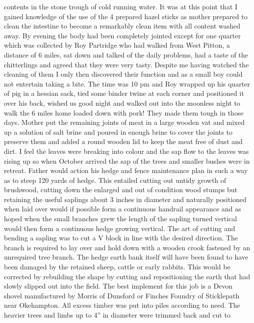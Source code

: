 contents in the stone trough of cold running water.  It was at this point that
I gained knowledge of the use of the 4 prepared hazel sticks as mother prepared
to clean the intestine to become a remarkably clean item with all content
washed away. By evening the body had been completely jointed except for one
quarter which was collected by Roy Partridge who had walked from West Pitton, a
distance of 6 miles, sat down and talked of the daily problems, had a taste of
the chitterlings and agreed that they were very tasty.  Despite me having
watched the cleaning of them I only then discovered their function and as a
small boy could not entertain taking a bite.  The time was 10 pm and Roy
wrapped up his quarter of pig in a hessian sack, tied some binder twine at each
corner and positioned it over his back, wished us good night and walked out
into the moonless night to walk the 6 miles home loaded down with pork!  They
made them tough in those days. Mother put the remaining joints of meat in a
large wooden vat and mixed up a solution of salt brine and poured in enough
brine to cover the joints to preserve them and added a round wooden lid to keep
the meat free of dust and dirt. I feel the leaves were breaking into colour and
the sap flow to the leaves was rising up so when October arrived the sap of the
trees and smaller bushes were in retreat. Father would action his hedge and
fence maintenance plan in such a way as to steep 120 yards of hedge.  This
entailed cutting out untidy growth of brushwood, cutting down the enlarged and
out of condition wood stumps but retaining the useful saplings about 3 inches
in diameter and naturally positioned when laid over would if possible form a
continuous handrail appearance  and as hoped when the small branches grew the
length of the sapling turned vertical would then form a continuous hedge
growing vertical.   The art of cutting and bending a sapling was to cut a V
block in line with the desired direction.  The branch is required to lay over
and hold down with a wooden crook fastened by an unrequired tree branch.  The
hedge earth bank itself will have been found to have been damaged by the
retained sheep, cattle or early rabbits.  This would be corrected by rebuilding
the shape by cutting and repositioning the earth that had slowly slipped out
into the field.   The best implement for this job is a Devon shovel
manufactured by Morris of Dunsford or Finches Foundry of Sticklepath near
Okehampton.  All excess timber was put into piles according to need.  The
heavier trees and limbs up to 4'' in diameter were trimmed back and cut to
